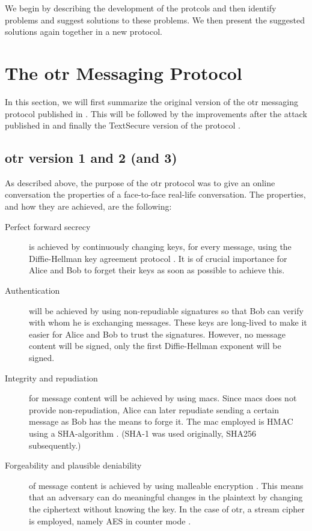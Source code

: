 We begin by describing the development of the protcols and then identify 
problems and suggest solutions to these problems.
We then present the suggested solutions again together in a new protocol.


\section{The \acs{otr} Messaging Protocol}

In this section, we will first summarize the original version of the \ac{otr} 
messaging protocol published in \cite{otr2004}.
This will be followed by the improvements after the attack published in 
\cite{di2005secure} and finally the TextSecure version of the protocol 
\cite{frosch2014secure}.

\subsection{\acs{otr} version 1 and 2 (and 3)}

As described above, the purpose of the \ac{otr} protocol was to give an online 
conversation the properties of a face-to-face real-life conversation.
The properties, and how they are achieved, are the following:
\begin{description}
  \item[Perfect forward secrecy] is achieved by continuously changing keys, for 
    every message, using the Diffie-Hellman key agreement protocol \cite{dh}.
    It is of crucial importance for Alice and Bob to forget their keys as soon 
    as possible to achieve this.

  \item[Authentication] will be achieved by using non-repudiable signatures so 
    that Bob can verify with whom he is exchanging messages.
    These keys are long-lived to make it easier for Alice and Bob to trust the 
    signatures.
    However, no message content will be signed, only the first Diffie-Hellman 
    exponent will be signed.

  \item[Integrity and repudiation] for message content will be achieved by 
    using \acp{mac}.
    Since \acp{mac} does not provide non-repudiation, Alice can later repudiate 
    sending a certain message as Bob has the means to forge it.
	The \ac{mac} employed is HMAC \cite{hmac} using a SHA-algorithm \cite{shs}.
    (SHA-1 was used originally, SHA256 subsequently.)

  \item[Forgeability and plausible deniability] of message content is achieved 
    by using malleable encryption \cite{nonmalleable}.
    This means that an adversary can do meaningful changes in the plaintext by 
    changing the ciphertext without knowing the key.
    In the case of \ac{otr}, a stream cipher is employed, namely AES \cite{aes} 
    in counter mode \cite{blockmodes}.
\end{description}

